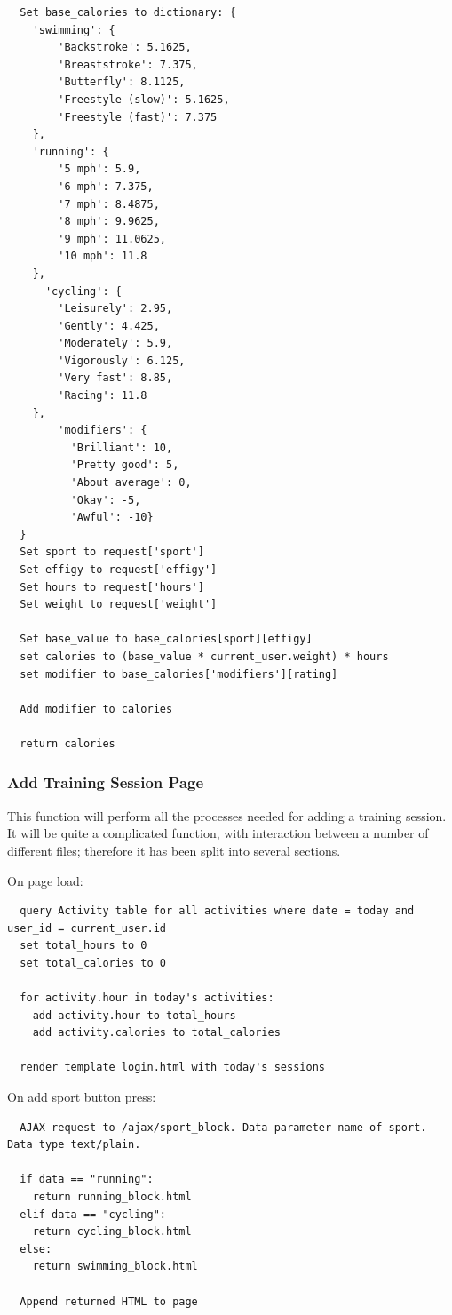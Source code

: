 \documentclass{article}[12pt,a4paper]
\begin{document}
\begin{verbatim}
  Set base_calories to dictionary: {
    'swimming': {
        'Backstroke': 5.1625, 
        'Breaststroke': 7.375, 
        'Butterfly': 8.1125, 
        'Freestyle (slow)': 5.1625,
        'Freestyle (fast)': 7.375
    },
    'running': {
        '5 mph': 5.9, 
        '6 mph': 7.375, 
        '7 mph': 8.4875, 
        '8 mph': 9.9625, 
        '9 mph': 11.0625, 
        '10 mph': 11.8
    },
      'cycling': {
        'Leisurely': 2.95, 
        'Gently': 4.425, 
        'Moderately': 5.9, 
        'Vigorously': 6.125, 
        'Very fast': 8.85,
        'Racing': 11.8
    },
        'modifiers': {
          'Brilliant': 10, 
          'Pretty good': 5, 
          'About average': 0, 
          'Okay': -5, 
          'Awful': -10}
  }
  Set sport to request['sport']
  Set effigy to request['effigy']
  Set hours to request['hours']
  Set weight to request['weight']

  Set base_value to base_calories[sport][effigy]
  set calories to (base_value * current_user.weight) * hours
  set modifier to base_calories['modifiers'][rating]

  Add modifier to calories

  return calories
\end{verbatim}

\subsubsection{Add Training Session Page}
This function will perform all the processes needed for adding a training session. It will be quite a complicated function, with interaction between a number of different files; therefore it has been split into several sections.


On page load:
\begin{verbatim}
  query Activity table for all activities where date = today and user_id = current_user.id
  set total_hours to 0
  set total_calories to 0

  for activity.hour in today's activities:
    add activity.hour to total_hours
    add activity.calories to total_calories

  render template login.html with today's sessions
\end{verbatim}

\noindent
On add sport button press:
\begin{verbatim}
  AJAX request to /ajax/sport_block. Data parameter name of sport. Data type text/plain.

  if data == "running":
    return running_block.html
  elif data == "cycling":
    return cycling_block.html
  else:
    return swimming_block.html

  Append returned HTML to page
\end{verbatim}
\end{document}
